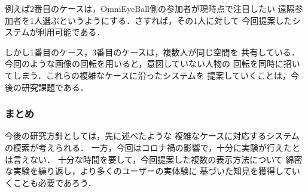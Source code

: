 例えば2番目のケースは，OmniEyeBall側の参加者が現時点で注目したい
遠隔参加者を1人選ぶというようにする．さすれば，その1人に対して
今回提案したシステムが利用可能である．

しかし1番目のケース，3番目のケースは，複数人が同じ空間を
共有している．今回のような画像の回転を用いると，意図していない人物の
回転を同時に招いてしまう．これらの複雑なケースに沿ったシステムを
提案していくことは，今後の研究課題である．

\subsubsection*{まとめ}
今後の研究方針としては，先に述べたような
複雑なケースに対応するシステムの模索が考えられる．
一方，今回はコロナ禍の影響で，十分に実験が行えたとは言えない．
十分な時間を要して，今回提案した複数の表示方法について
綿密な実験を繰り返し，より多くのユーザーの実体験に
基づいた知見を獲得していくことも必要であろう．